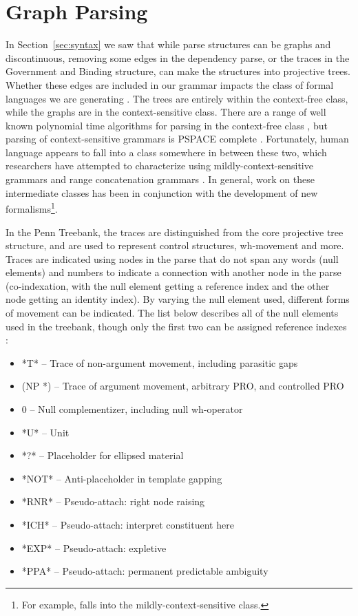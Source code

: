\section{Graph Parsing} \label{sec:intro-graph}

In Section~\ref{sec:syntax} we saw that while parse structures can be graphs and discontinuous, removing some edges in the dependency parse, or the traces in the Government and Binding structure, can make the structures into projective trees.
Whether these edges are included in our grammar impacts the class of formal languages we are generating \parencite{Chomsky-grammars}.
The trees are entirely within the context-free class, while the graphs are in the context-sensitive class.
There are a range of well known polynomial time algorithms for parsing in the context-free class \parencite{Cocke:1969,Younger:1967,Kasami:1966,Earley:1970,Lang:1974}, but parsing of context-sensitive grammars is PSPACE complete \parencite{Kuroda:1964,Savitch:1970}.
Fortunately, human language appears to fall into a class somewhere in between these two, which researchers have attempted to characterize using mildly-context-sensitive grammars \parencite{weir-joshi:1988:ACL} and range concatenation grammars \parencite{Boullier:1998}.
In general, work on these intermediate classes has been in conjunction with the development of new formalisms\footnote{
For example, \ccg falls into the mildly-context-sensitive class.
}.

In the Penn Treebank, the traces are distinguished from the core projective tree structure, and are used to represent control structures, wh-movement and more.
Traces are indicated using nodes in the parse that do not span any words (null elements) and numbers to indicate a connection with another node in the parse (co-indexation, with the null element getting a reference index and the other node getting an identity index).
By varying the null element used, different forms of movement can be indicated.
The list below describes all of the null elements used in the treebank, though only the first two can be assigned reference indexes \parencite{ptb-guide}:

\begin{itemize}
  \item *T* -- Trace of non-argument movement, including parasitic gaps
  \item (NP *) -- Trace of argument movement, arbitrary PRO, and controlled PRO
  \item 0 -- Null complementizer, including null wh-operator
  \item *U* -- Unit
  \item *?* -- Placeholder for ellipsed material
  \item *NOT* -- Anti-placeholder in template gapping
  \item *RNR* -- Pseudo-attach: right node raising
  \item *ICH* -- Pseudo-attach: interpret constituent here
  \item *EXP* -- Pseudo-attach: expletive
  \item *PPA* -- Pseudo-attach: permanent predictable ambiguity
\end{itemize}

